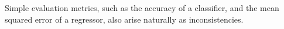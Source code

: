 \documentclass[twoside]{article}
\theoremstyle{plain}
\theoremstyle{definition}
\begin{document}

Simple evaluation metrics, such as the accuracy of a classifier, and the mean squared error of a regressor, also arise naturally as inconsistencies.
\end{document}
